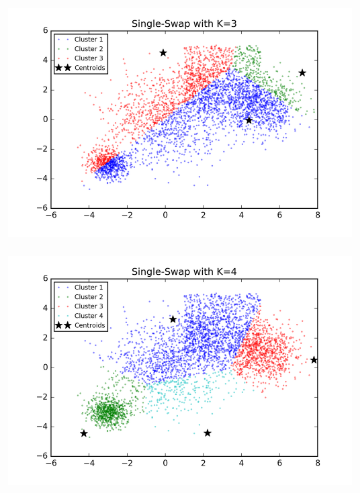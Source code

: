 \begin{description}
\begin{description}
\begin{figure}[!h]
        \centering
        \begin{subfigure}[b]{0.475\textwidth}
            \centering
            \includegraphics[width=\textwidth]{./figures/bigClustering_singleSwap_3.png}
        \end{subfigure}
        \hfill
        \begin{subfigure}[b]{0.475\textwidth}  
            \centering 
            \includegraphics[width=\textwidth]{./figures/bigClustering_singleSwap_4.png}
        \end{subfigure}
        \begin{subfigure}[b]{0.475\textwidth}  
            \centering 

\end{subfigure}
\end{figure}
\end{description}
\end{description}
